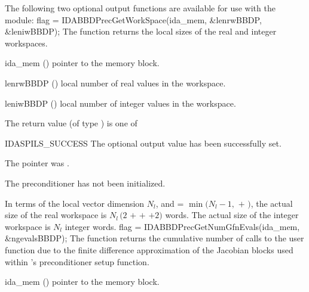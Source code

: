 {{}
The following two optional output functions are available for use with
the {\idabbdpre} module:
{
  flag = IDABBDPrecGetWorkSpace(ida\_mem, \&lenrwBBDP, \&leniwBBDP);
}
{
  The function  returns the local sizes
  of the {\idabbdpre} real and integer workspaces.
}
{
  \begin{args}[lenrwBBDP]
  \item[ida\_mem] ()
    pointer to the {\ida} memory block.
  \item[lenrwBBDP] ()
    local number of real values in the {\idabbdpre} workspace.
  \item[leniwBBDP] ()
    local number of integer values in the {\idabbdpre} workspace.
  \end{args}
}
{
  The return value  (of type ) is one of
  \begin{args}
  \item[IDASPILS\_SUCCESS] 
    The optional output value has been successfully set.
  \item[\id{IDASPILS\_MEM\_NULL}] 
    The  pointer was .
  \item[\Id{IDASPILS\_PMEM\_NULL}]
    The {\idabbdpre} preconditioner has not been initialized.
  \end{args}
}
{
  In terms of the local vector dimension $N_l$, and
   = $\min ( N_l - 1 ,$  $+$ $)$,
  the actual size of the real workspace is
  $N_l \,(2$  $+$  $+$  $+2)$  words.
  The actual size of the integer workspace is $N_l$ integer words.
}
{
  flag = IDABBDPrecGetNumGfnEvals(ida\_mem, \&ngevalsBBDP);
}
{
  The function  returns the
  cumulative number of calls to the user  function due to the 
  finite difference approximation of the Jacobian blocks used within
  {\idabbdpre}'s preconditioner setup function.
}
{
  \begin{args}[ngevalsBBDP]
  \item[ida\_mem] ()
    pointer to the {\ida} memory block.

\end{args}}}
